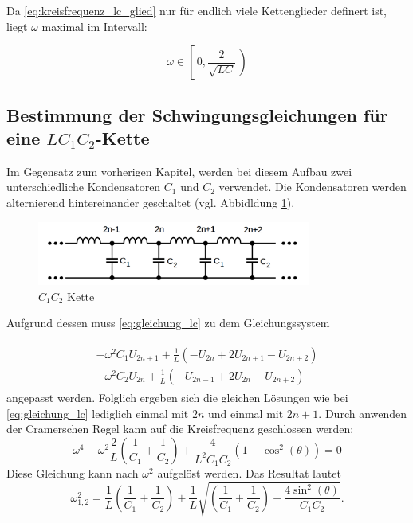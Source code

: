Da \eqref{eq:kreisfrequenz_lc_glied} nur für endlich viele Kettenglieder definert ist, liegt $\omega$ maximal im Intervall:

\begin{equation}
\label{eq:menge_omega_lc_glied}
\omega\in\left[\,0,\frac{2}{\sqrt{LC}}\,\right)
\end{equation}

\subsection{Bestimmung der Schwingungsgleichungen für eine $LC_1C_2$-Kette}
Im Gegensatz zum vorherigen Kapitel, werden bei diesem Aufbau zwei unterschiedliche 
Kondensatoren $C_1$ und $C_2$ verwendet. Die Kondensatoren werden
alternierend hintereinander geschaltet (vgl. Abbidldung \ref{fig:alternierende_kette}).

\begin{figure}
  \centering
  \includegraphics[width=0.8\textwidth]{bilder/alternierende_kette.png}
  \caption{$C_1C_2$ Kette}
  \label{fig:alternierende_kette}
\end{figure}


Aufgrund dessen muss \eqref{eq:gleichung_lc} zu dem Gleichungssystem

\begin{align}
\label{eq:lc1c2_gleichungsy}
\begin{aligned}
-\omega^2C_1U_{2n+1}+\frac{1}{L}\left(-U_{2n}+2U_{2n+1}-U_{2n+2}\right)\\
-\omega^2C_2U_{2n}+\frac{1}{L}\left(-U_{2n-1}+2U_{2n}-U_{2n+2}\right)
\end{aligned}
\end{align}
angepasst werden.
Folglich ergeben sich die gleichen Lösungen wie bei \eqref{eq:gleichung_lc}
lediglich einmal mit $2n$ und einmal mit $2n+1$.
Durch anwenden der Cramerschen Regel kann auf die Kreisfrequenz geschlossen werden:
\begin{equation*}
\omega^4-\omega^2\frac{2}{L}\left(\frac{1}{C_1}+\frac{1}{C_2}\right)+\frac{4}{L^2C_1C_2}\left(1-\cos^2(\theta)\right)=0
\end{equation*}
Diese Gleichung kann nach $\omega^2$ aufgelöst werden.
Das Resultat lautet
\begin{equation}
\label{eq:omgea_ceins_czwei}
\omega_{1,2}^{2}=\frac{1}{L}\left(\frac{1}{C_1}+\frac{1}{C_2}\right)\pm\frac{1}{L}\sqrt{\left(\frac{1}{C_1}+\frac{1}{C_2}\right)-\frac{4\sin^2(\theta)}{C_1C_2}}.
\end{equation}


